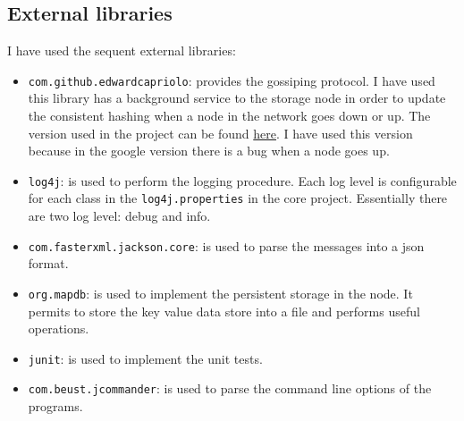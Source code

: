 \subsection{External libraries}
I have used the sequent external libraries:
\begin{itemize}
\item \texttt{com.github.edwardcapriolo}: provides the gossiping protocol. I have used this library has a background service to the storage node in order to update the consistent hashing when a node in the network goes down or up.
The version used in the project can be found \href{https://jitpack.io/#edwardcapriolo/gossip/master}{here}. I have used this version because in the google version there is a bug when a node goes up.

\item \texttt{log4j}: is used to perform the logging procedure. Each log level is configurable for each class in the \texttt{log4j.properties} in the core project. Essentially there are two log level: debug and info.

\item \texttt{com.fasterxml.jackson.core}: is used to parse the messages into a json format.

\item \texttt{org.mapdb}: is used to implement the persistent storage in the node. It permits to store the key value data store into a file and performs useful operations.

\item \texttt{junit}: is used to implement the unit tests.

\item \texttt{com.beust.jcommander}: is used to parse the command line options of the programs.

\end{itemize}